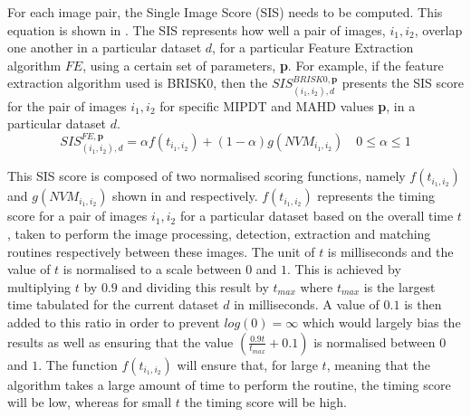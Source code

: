 For each image pair, the Single Image Score (SIS) needs to be computed. This equation is shown in . The SIS represents how well a pair of images, $i_1, i_2$, overlap one another in a particular dataset $d$, for a particular Feature Extraction algorithm $FE$, using a certain set of parameters, \textbf{p}. For example, if the feature extraction algorithm used is BRISK0, then the $SIS_{(i_1, i_2), d}^{BRISK0, \textbf{p}}$ presents the SIS score for the pair of images $i_1, i_2$ for specific MIPDT and MAHD values \textbf{p}, in a particular dataset $d$. \\

\begin{equation}
SIS_{(i_1, i_2), d}^{FE, \textbf{p}} = \alpha f(t_{i_1,i_2}) + (1-\alpha) g(\textit{NVM}_{i_1,i_2}) \quad 0 \leq \alpha \leq 1
\label{eqn:optimalParameters}
\end{equation}

This SIS score is composed of two normalised scoring functions, namely $f(t_{i_1, i_2})$ and $g(NVM_{i_1, i_2})$ shown in  and  respectively. $f(t_{i_1, i_2})$ represents the timing score for a pair of images $i_1, i_2$ for a particular dataset based on the overall time $t$, taken to perform the image processing, detection, extraction and matching routines respectively between these images. The unit of $t$ is milliseconds and the value of $t$ is normalised to a scale between $0$ and $1$. This is achieved by multiplying $t$ by $0.9$ and dividing this result by $t_{max}$ where $t_{max}$ is the largest time tabulated for the current dataset $d$ in milliseconds. A value of $0.1$ is then added to this ratio in order to  prevent $log(0) = \infty$ which would largely bias the results as well as ensuring that the value $(\frac{0.9 t}{t_{max}} + 0.1)$ is normalised between $0$ and $1$. The function $f(t_{i_1, i_2})$ will ensure that, for large $t$, meaning that the algorithm takes a large amount of time to perform the routine, the timing score will be low, whereas for small $t$ the timing score will be high. \\

